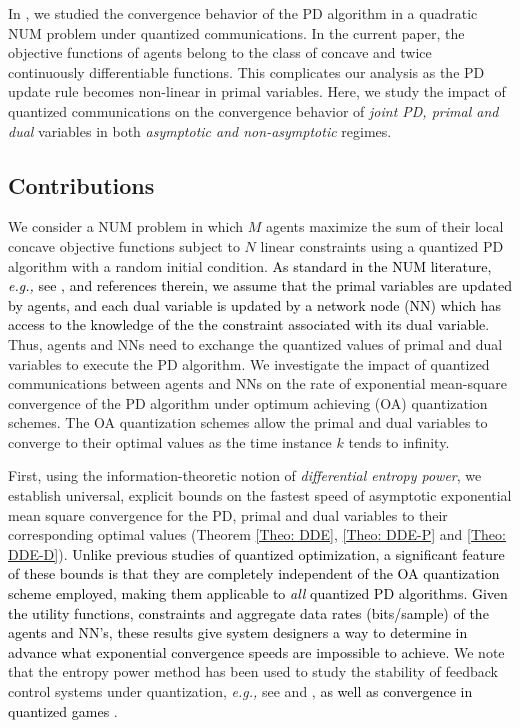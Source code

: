 \documentclass[10pt,twocolumn,twoside]{IEEEtran}
\begin{document}
In \cite{NNA15-CDC}, we studied the convergence behavior of the PD algorithm in a quadratic NUM problem under quantized communications. 
 In the current paper, the objective functions of agents belong to the class of concave and twice continuously differentiable functions. This complicates our analysis as the PD update rule becomes non-linear in primal variables. Here, we study the impact of quantized communications on the convergence behavior of \emph{joint PD, primal and dual} variables in both \emph{asymptotic and non-asymptotic} regimes.

\subsection{Contributions}
We consider a NUM problem in which  $M$ agents  maximize the sum of their local concave objective functions subject to $N$ linear constraints using a quantized PD algorithm with a random initial condition. \textcolor{black}{As standard in the NUM literature, \emph{e.g.,} see  \cite{KMT98}, \cite{SS07} and references therein, we assume that the primal variables are updated by agents, and each dual variable is updated by a network node (NN) which has access to the knowledge of the the constraint associated with its dual variable}.
Thus, agents and NNs need to exchange the quantized values of primal and dual variables to execute the PD algorithm.
We investigate the impact of quantized communications between agents and NNs on the rate of exponential mean-square convergence of the PD algorithm  under optimum achieving (OA) quantization schemes. The OA quantization schemes allow the primal and dual variables to converge to their optimal values as the time instance $k$ tends to infinity. 

First, using the information-theoretic notion of {\em differential entropy power}, we establish universal, explicit bounds on the fastest speed of asymptotic exponential mean square convergence for the PD, primal and dual variables to their corresponding optimal values (Theorem \ref{Theo: DDE}, \ref{Theo: DDE-P} and \ref{Theo: DDE-D}).
\textcolor{black}{Unlike previous studies of quantized optimization, a significant feature of these bounds is that they are completely independent of the OA quantization scheme employed,  making them 
applicable to {\em all} quantized PD algorithms. Given the utility functions, constraints and aggregate data rates (bits/sample)  of the agents and NN's, these results
give  system designers a way to determine in advance what exponential convergence speeds are  impossible to achieve.}
We note that the entropy power method has been used to study the stability of feedback control systems under quantization, \emph{e.g.,} see \cite{NE04} and \cite{FMS10}, \textcolor{black}{as well as convergence in quantized games \cite{NNA15}}.
\end{document}
